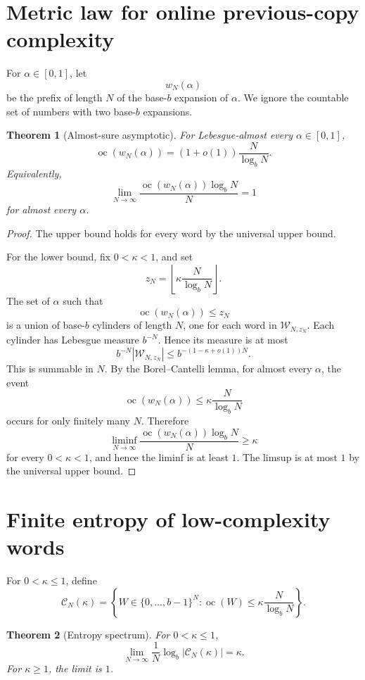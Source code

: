 \documentclass[11pt]{amsart}
\newtheorem{theorem}{Theorem}[section]
\DeclareMathOperator{\oc}{oc}
\begin{document}
\section{Metric law for online previous-copy complexity}

For $\alpha\in[0,1]$, let
\[
w_N(\alpha)
\]
be the prefix of length $N$ of the base-$b$ expansion of $\alpha$. We ignore the countable set of numbers with two base-$b$ expansions.

\begin{theorem}[Almost-sure asymptotic]
For Lebesgue-almost every $\alpha\in[0,1]$,
\[
\oc(w_N(\alpha))
=
(1+o(1))\frac{N}{\log_b N}.
\]
Equivalently,
\[
\lim_{N\to\infty}
\frac{\oc(w_N(\alpha))\log_b N}{N}
=
1
\]
for almost every $\alpha$.
\end{theorem}

\begin{proof}
The upper bound holds for every word by the universal upper bound.

For the lower bound, fix $0<\kappa<1$, and set
\[
z_N=\left\lfloor \kappa\frac{N}{\log_b N}\right\rfloor.
\]
The set of $\alpha$ such that
\[
\oc(w_N(\alpha))\leq z_N
\]
is a union of base-$b$ cylinders of length $N$, one for each word in $\mathcal W_{N,z_N}$. Each cylinder has Lebesgue measure $b^{-N}$. Hence its measure is at most
\[
b^{-N}|\mathcal W_{N,z_N}|
\leq
b^{-(1-\kappa+o(1))N}.
\]
This is summable in $N$. By the Borel--Cantelli lemma, for almost every $\alpha$, the event
\[
\oc(w_N(\alpha))\leq \kappa\frac{N}{\log_b N}
\]
occurs for only finitely many $N$. Therefore
\[
\liminf_{N\to\infty}
\frac{\oc(w_N(\alpha))\log_b N}{N}
\geq \kappa
\]
for every $0<\kappa<1$, and hence the liminf is at least $1$. The limsup is at most $1$ by the universal upper bound.
\end{proof}

\section{Finite entropy of low-complexity words}

For $0<\kappa\leq1$, define
\[
\mathcal C_N(\kappa)
=
\left\{
W\in\{0,\ldots,b-1\}^N:
\oc(W)\leq
\kappa\frac{N}{\log_b N}
\right\}.
\]

\begin{theorem}[Entropy spectrum]
For $0<\kappa\leq1$,
\[
\lim_{N\to\infty}
\frac1N\log_b|\mathcal C_N(\kappa)|
=
\kappa.
\]
For $\kappa\geq1$, the limit is $1$.
\end{theorem}
\end{document}
